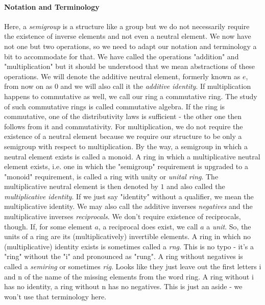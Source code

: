 \paragraph{Notation and Terminology}
Here, a \emph{semigroup} is a structure like a group but we do not necessarily require the existence of inverse elements and not even a neutral element. We now have not one but two operations, so we need to adapt our notation and terminology a bit to accommodate for that. We have called the operations "addition" and "multiplication" but it should be understood that we mean abstractions of these operations. We will denote the additive neutral element, formerly known as $e$, from now on as $0$ and we will also call it the \emph{additive identity}. If multiplication happens to commutative as well, we call our ring a commutative ring. The study of such commutative rings is called commutative algebra. If the ring is commutative, one of the distributivity laws is sufficient - the other one then follows from it and commutativity. For multiplication, we do not require the existence of a neutral element because we require our structure to be only a semigroup with respect to multiplication. By the way, a semigroup in which a neutral element exists is called a monoid. A ring in which a multiplicative neutral element exists, i.e. one in which the "semigroup" requirement is upgraded to a "monoid" requirement, is called a ring with unity or \emph{unital ring}. The multiplicative neutral element is then denoted by $1$ and also called the \emph{multiplicative identity}. If we just say "identity" without a qualifier, we mean the multiplicative identity. We may also call the additive inverses \emph{negatives} and the multiplicative inverses \emph{reciprocals}. We don't require existence of reciprocals, though. If, for some element $a$, a reciprocal does exist, we call $a$ a \emph{unit}. So, the units of a ring are its (multiplicatively) invertible elements. A ring in which no (multiplicative) identity exists is sometimes called a \emph{rng}. This is no typo - it's a "ring" without the "i" and pronounced as "rung".  A ring without negatives is called a \emph{semiring} or sometimes \emph{rig}. Looks like they just leave out the first letters i and n of the name of the missing elements from the word ring. A ring without i has no identity, a ring without n has no negatives. This is just an aside - we won't use that terminology here.


